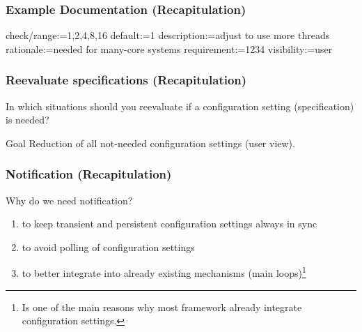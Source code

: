 \begin{frame}[fragile]
	\frametitle{Example Documentation (Recapitulation)}

	\begin{code}
	  check/range:=1,2,4,8,16
	  default:=1
	  description:=adjust to use more threads
	  rationale:=needed for many-core systems
	  requirement:=1234
	  visibility:=user
	\end{code}
\end{frame}

\begin{frame}
	\frametitle{Reevaluate specifications (Recapitulation)}

	\begin{task}
	In which situations should you reevaluate if a configuration setting (specification) is needed?
	\end{task}

	\pause


	\begin{alertblock}{Goal}
	Reduction of all not-needed configuration settings (user view).
	\end{alertblock}
\end{frame}


\begin{frame}
	\frametitle{Notification (Recapitulation)}

	\begin{task}
	Why do we need notification?
	\end{task}

	\pause

	\begin{enumerate}
	\item to keep transient and persistent configuration settings always in sync~\cite{jin2014configurations}
	\item to avoid polling of configuration settings
	\item to better integrate into already existing mechanisms (main loops)\footnote{Is one of the main reasons why most framework already integrate configuration settings.}
	\end{enumerate}

\end{frame}

